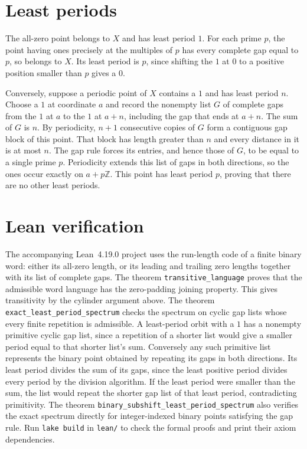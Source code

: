 \documentclass[11pt]{article}
\begin{document}
\section*{Least periods}

The all-zero point belongs to \(X\) and has least period \(1\).
For each prime \(p\), the point having ones precisely at the multiples
of \(p\) has every complete gap equal to \(p\), so belongs to \(X\).
Its least period is \(p\), since shifting the \(1\) at \(0\) to a
positive position smaller than \(p\) gives a \(0\).

Conversely, suppose a periodic point of \(X\) contains a \(1\) and
has least period \(n\). Choose a \(1\) at coordinate \(a\) and record
the nonempty list \(G\) of complete gaps from the \(1\) at \(a\) to
the \(1\) at \(a+n\), including the gap that ends at \(a+n\).
The sum of \(G\) is \(n\). By periodicity, \(n+1\) consecutive
copies of \(G\) form a contiguous gap block of this point. That block
has length greater than \(n\) and every distance in it is at most
\(n\). The gap rule forces its entries, and hence those of \(G\),
to be equal to a single prime \(p\). Periodicity extends this list
of gaps in both directions, so the ones occur exactly on
\(a+p\mathbb Z\). This point has least period \(p\), proving that
there are no other least periods.

\section*{Lean verification}

The accompanying Lean~4.19.0 project uses the run-length code of a finite
binary word: either its all-zero length, or its leading and trailing
zero lengths together with its list of complete gaps. The theorem
\verb|transitive_language| proves that the admissible word language
has the zero-padding joining property. This gives transitivity by the
cylinder argument above. The theorem \verb|exact_least_period_spectrum|
checks the spectrum on cyclic gap lists whose every finite repetition
is admissible. A least-period orbit with a \(1\) has a nonempty primitive
cyclic gap list, since a repetition of a shorter list would give a
smaller period equal to that shorter list's sum. Conversely any such
primitive list represents the binary point obtained by repeating its
gaps in both directions. Its least period divides the sum of its gaps,
since the least positive period divides every period by the division
algorithm. If the least period were smaller than the sum, the list
would repeat the shorter gap list of that least period, contradicting
primitivity. The theorem \verb|binary_subshift_least_period_spectrum|
also verifies the exact spectrum directly for integer-indexed binary
points satisfying the gap rule. Run \verb|lake build| in \verb|lean/|
to check the formal proofs and print their axiom dependencies.
\end{document}
